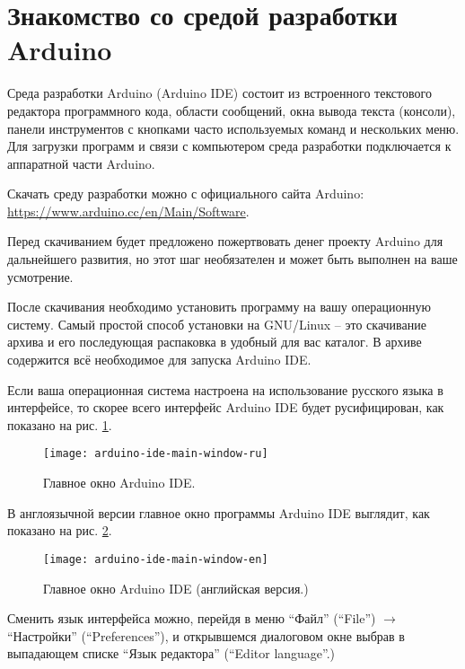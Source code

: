 \documentclass[../main.tex]{subfiles}
\begin{document}
\section{Знакомство со средой разработки Arduino}
Среда разработки Arduino (Arduino IDE) состоит из встроенного текстового
редактора программного кода, области сообщений, окна вывода текста (консоли),
панели инструментов с кнопками часто используемых команд и нескольких меню. Для
загрузки программ и связи с компьютером среда разработки подключается к
аппаратной части Arduino.

Скачать среду разработки можно с официального сайта Arduino:
\url{https://www.arduino.cc/en/Main/Software}.

Перед скачиванием будет предложено пожертвовать денег проекту Arduino для
дальнейшего развития, но этот шаг необязателен и может быть выполнен на ваше
усмотрение.

После скачивания необходимо установить программу на вашу операционную систему.
Самый простой способ установки на GNU/Linux -- это скачивание архива и его
последующая распаковка в удобный для вас каталог.  В архиве содержится всё
необходимое для запуска Arduino IDE.

Если ваша операционная система настроена на использование русского языка в
интерфейсе, то скорее всего интерфейс Arduino IDE будет русифицирован, как
показано на рис. \ref{fig:arduino-ide-main-window-ru}.

\begin{figure}[ht]
  \centering
  \caption{Главное окно Arduino IDE.}
  \texttt{[image: arduino-ide-main-window-ru]}
  \label{fig:arduino-ide-main-window-ru}
\end{figure}

В англоязычной версии главное окно программы Arduino IDE выглядит, как показано
на рис. \ref{fig:arduino-ide-main-window-en}.

\begin{figure}[ht]
  \centering
  \caption{Главное окно Arduino IDE (английская версия.)}
  \texttt{[image: arduino-ide-main-window-en]}
  \label{fig:arduino-ide-main-window-en}
\end{figure}

Сменить язык интерфейса можно, перейдя в меню ``Файл'' (``File'') $\rightarrow$ ``Настройки'' (``Preferences''), и
открывшемся диалоговом окне выбрав в выпадающем списке ``Язык редактора'' (``Editor language''.)
\end{document}
